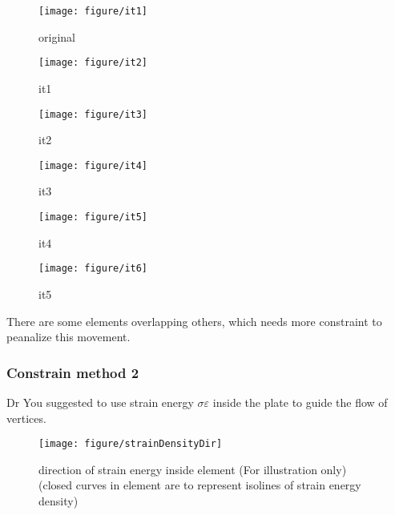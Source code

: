 \begin{figure}[htbp]
	\centering
	\begin{minipage}{0.3\textwidth}
		\centering
		\texttt{[image: figure/it1]}
		\caption{original}\label{fig:it0}
	\end{minipage}
	\begin{minipage}{0.3\textwidth}
		\centering
		\texttt{[image: figure/it2]}
		\caption{it1}\label{fig:it2}
	\end{minipage}
	\vspace{\baselineskip}
	\begin{minipage}{0.3\textwidth}
		\centering
		\texttt{[image: figure/it3]}
		\caption{it2}\label{fig:it3}
	\end{minipage}
	\vspace{\baselineskip}
	\begin{minipage}{0.3\textwidth}
		\centering
		\texttt{[image: figure/it4]}
		\caption{it3}\label{fig:it4}
	\end{minipage}
	\begin{minipage}{0.3\textwidth}
		\centering
		\texttt{[image: figure/it5]}
		\caption{it4}\label{fig:it5}
	\end{minipage}
	\vspace{\baselineskip}
	\begin{minipage}{0.3\textwidth}
		\centering
		\texttt{[image: figure/it6]}
		\caption{it5}\label{fig:it6}
	\end{minipage}
	\vspace{\baselineskip}
\end{figure}

There are some elements overlapping others, which needs more constraint to peanalize this movement.

\subsubsection{Constrain method 2}
Dr You suggested to use strain energy $ \sigma \varepsilon $ inside the plate to guide the flow of vertices. 

\begin{figure}[h!]
\centering
\texttt{[image: figure/strainDensityDir]}
\caption{direction of strain energy inside element (For illustration only) (closed curves in element are to represent isolines of strain energy density)}
\label{fig:straindensitydir}
\end{figure}

